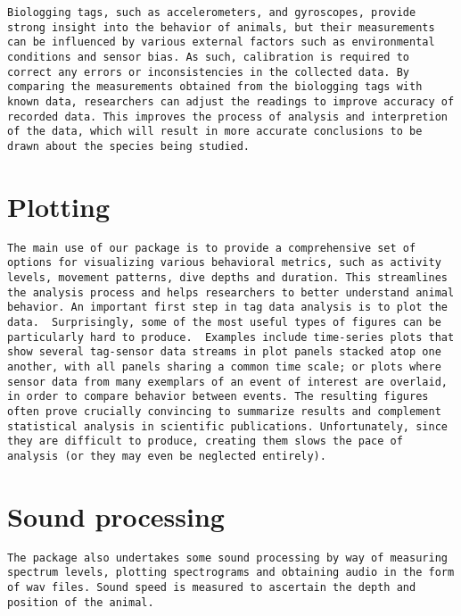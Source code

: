 \begin{verbatim}
Biologging tags, such as accelerometers, and gyroscopes, provide strong insight into the behavior of animals, but their measurements can be influenced by various external factors such as environmental conditions and sensor bias. As such, calibration is required to correct any errors or inconsistencies in the collected data. By comparing the measurements obtained from the biologging tags with known data, researchers can adjust the readings to improve accuracy of recorded data. This improves the process of analysis and interpretion of the data, which will result in more accurate conclusions to be drawn about the species being studied. 
\end{verbatim}

\hypertarget{plotting}{%
\section{Plotting}\label{plotting}}

\begin{verbatim}
The main use of our package is to provide a comprehensive set of options for visualizing various behavioral metrics, such as activity levels, movement patterns, dive depths and duration. This streamlines the analysis process and helps researchers to better understand animal behavior. An important first step in tag data analysis is to plot the data.  Surprisingly, some of the most useful types of figures can be particularly hard to produce.  Examples include time-series plots that show several tag-sensor data streams in plot panels stacked atop one another, with all panels sharing a common time scale; or plots where sensor data from many exemplars of an event of interest are overlaid, in order to compare behavior between events. The resulting figures often prove crucially convincing to summarize results and complement statistical analysis in scientific publications. Unfortunately, since they are difficult to produce, creating them slows the pace of analysis (or they may even be neglected entirely).
\end{verbatim}

\hypertarget{sound-processing}{%
\section{Sound processing}\label{sound-processing}}

\begin{verbatim}
The package also undertakes some sound processing by way of measuring spectrum levels, plotting spectrograms and obtaining audio in the form of wav files. Sound speed is measured to ascertain the depth and position of the animal. 
\end{verbatim}

